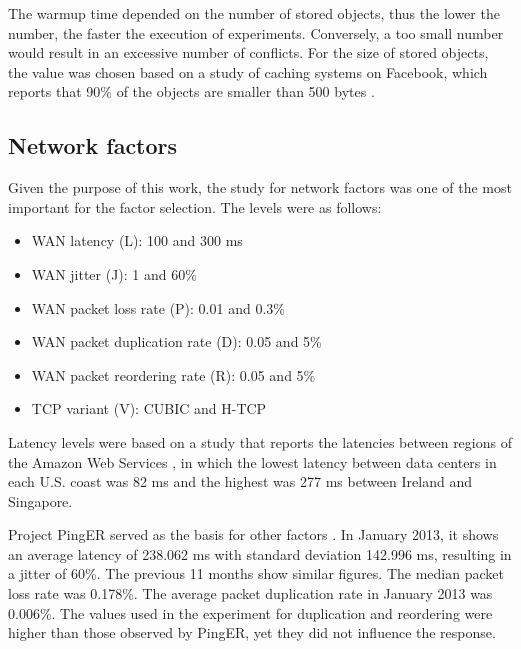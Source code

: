 \documentclass[doublespacing]{bmcart}
\begin{document}
The warmup time depended on the number of stored objects, thus the lower the
number, the faster the execution of experiments.  Conversely, a too small number
would result in an excessive number of conflicts.  For the size of stored
objects, the value was chosen based on a study of caching systems on Facebook,
which reports that 90\% of the objects are smaller than 500 bytes
\cite{Atikoglu2012}.

\subsection{Network factors}

Given the purpose of this work, the study for network factors was one of the
most important for the factor selection. The levels were as follows:

\begin{itemize}

\item WAN latency (L): 100 and 300 ms

\item WAN jitter (J): 1 and 60\%

\item WAN packet loss rate (P): 0.01 and 0.3\%

\item WAN packet duplication rate (D): 0.05 and 5\%

\item WAN packet reordering rate (R): 0.05 and 5\%

\item TCP variant (V): CUBIC and H-TCP

\end{itemize}

Latency levels were based on a study that reports the latencies between regions
of the Amazon Web Services \cite{Sovran2011}, in which the lowest latency
between data centers in each U.S. coast was 82 ms and the highest was 277 ms
between Ireland and Singapore.

Project PingER served as the basis for other factors \cite{PingER2013}. In
January 2013, it shows an average latency of 238.062 ms with standard deviation
142.996 ms, resulting in a jitter of 60\%. The previous 11 months show similar
figures. The median packet loss rate was 0.178\%. The average packet
duplication rate in January 2013 was 0.006\%. The values used in the experiment
for duplication and reordering were higher than those observed by PingER, yet
they did not influence the response.
\end{document}
